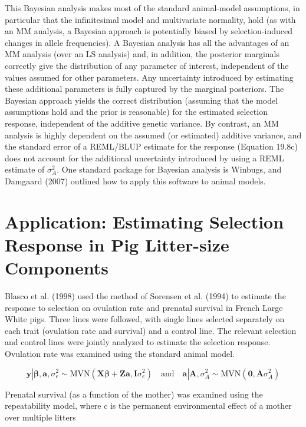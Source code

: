 \documentclass{article}
\begin{document}
This Bayesian analysis makes most of the standard animal-model assumptions, in particular that the infinitesimal model and multivariate normality, hold (as with an MM analysis, a Bayesian approach is potentially biased by selection-induced changes in allele frequencies). A Bayesian analysis has all the advantages of an MM analysis (over an LS analysis) and, in addition, the posterior marginals correctly give the distribution of any parameter of interest, independent of the values assumed for other parameters. Any uncertainty introduced by estimating these additional parameters is fully captured by the marginal posteriors. The Bayesian approach yields the correct distribution (assuming that the model assumptions hold and the prior is reasonable) for the estimated selection response, independent of the additive genetic variance. By contrast, an MM analysis is highly dependent on the assumed (or estimated) additive variance, and the standard error of a REML/BLUP estimate for the response (Equation 19.8c) does not account for the additional uncertainty introduced by using a REML estimate of  $ \sigma_A^2 $. One standard package for Bayesian analysis is Winbugs, and Damgaard (2007) outlined how to apply this software to animal models.

\section{Application: Estimating Selection Response in Pig Litter-size Components}
Blasco et al. (1998) used the method of Sorensen et al. (1994) to estimate the response to selection on ovulation rate and prenatal survival in French Large White pigs. Three lines were followed, with single lines selected separately on each trait (ovulation rate and survival) and a control line. The relevant selection and control lines were jointly analyzed to estimate the selection response. Ovulation rate was examined using the standard animal model.

\begin{equation}
\mathbf{y}\left|\boldsymbol{\beta},\mathbf{a},\sigma_{e}^{2}\sim\mathrm{MVN}(\mathbf{X}\boldsymbol{\beta}+\mathbf{Z}\mathbf{a},\mathbf{I}\sigma_{e}^{2})\right.\quad\mathrm{a n d}\quad\mathbf{a}\left|\mathbf{A},\sigma_{A}^{2}\sim\mathrm{MVN}(\mathbf{0},\mathbf{A}\sigma_{A}^{2})\right.
\end{equation}

Prenatal survival (as a function of the mother) was examined using the repeatability model, where c is the permanent environmental effect of a mother over multiple litters
\end{document}
